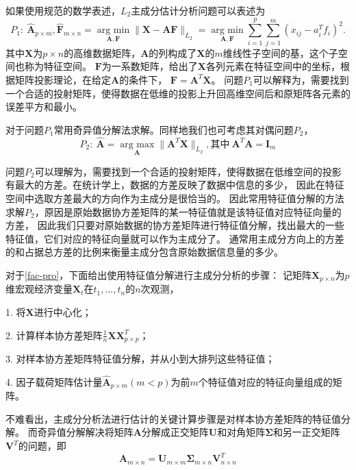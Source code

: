 如果使用规范的数学表述，$L_2$主成分估计分析问题可以表述为
\begin{equation}\label{pca-l2-p1}
P_1: \ \hat{\bm{A}}_{p\times m}, \hat{\bm{F}}_{m\times n} = \underset{\bm{A},\bm{F}}{\operatorname{arg\ min} } 
\|\bm{X} - \bm{A}\bm{F}\|_{L_2}
 = \underset{\bm{A}, \bm{F}}{\operatorname{arg\ min}} \sum_{i=1}^p \sum_{j=1}^m (x_{ij} - a_i^Tf_i)^2 .
\end{equation}
其中$\bm{X}$为$p \times n$的高维数据矩阵，$\bm{A}$的列构成了$\bm{X}$的$m$维线性子空间的基，这个子空间也称为特征空间。
$\bm{F}$为一系数矩阵，给出了$\bm{X}$各列元素在特征空间中的坐标，根据矩阵投影理论，在给定$\bm{A}$的条件下，
$\bm{F} = \bm{A}^T \bm{X}$。
问题$P_1$可以解释为，需要找到一个合适的投射矩阵，使得数据在低维的投影上升回高维空间后和原矩阵各元素的误差平方和最小。

对于问题$P_1$常用奇异值分解法求解。同样地我们也可考虑其对偶问题$P_2$，
\begin{equation}\label{pca-l2-p2}
P_2: \ \hat{\bm{A}} = \underset{\bm{A}}{\operatorname{arg\ max}} \| \bm{A}^T \bm{X}\|_{L_2}, \text{其中}\ \bm{A}^T
\bm{A} = \bm{I}_m
\end{equation}

问题$P_2$可以理解为，需要找到一个合适的投射矩阵，使得数据在低维空间的投影有最大的方差。在统计学上，数据的方差反映了数据中信息的多少，
因此在特征空间中选取方差最大的方向作为主成分是很恰当的。
因此常用特征值分解的方法求解$P_2$，原因是原始数据协方差矩阵的某一特征值就是该特征值对应特征向量的方差，
因此我们只要对原始数据的协方差矩阵进行特征值分解，找出最大的一些特征值，它们对应的特征向量就可以作为主成分了。
通常用主成分方向上的方差的和占据总方差的比例来衡量主成分包含原始数据信息量的多少。

对于\eqref{fac-pro}，下面给出使用特征值分解进行主成分分析的步骤：
记矩阵$\bm{X}_{p\times n}$为$p$维宏观经济变量$\bm{X}_t$在$t_1, ..., t_n$的$n$次观测，

1. 将$\bm{X}$进行中心化；

2. 计算样本协方差矩阵$\frac1{n}\bm{X}\bm{X}^T_{p\times p}$；

3. 对样本协方差矩阵特征值分解，并从小到大排列这些特征值；

4. 因子载荷矩阵估计量$\hat{\bm{A}}_{p\times m} (m < p)$为前$m$个特征值对应的特征向量组成的矩阵。

不难看出，主成分分析法进行估计的关键计算步骤是对样本协方差矩阵的特征值分解。
而奇异值分解解决将矩阵$\bm{A}$分解成正交矩阵$\bm{U}$和对角矩阵$\bm{\Sigma}$和另一正交矩阵$\bm{V}^T$的问题，即
$$
    \bm{A}_{m \times n} = \bm{U}_{m \times m}\bm{\Sigma}_{m \times n}\bm{V}_{n \times n}^T
$$

